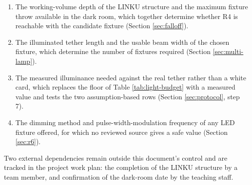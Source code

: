 \begin{enumerate}
    \item The working-volume depth of the LINKU structure and the maximum fixture throw available in the dark room, which together determine whether R4 is reachable with the candidate fixture (Section \ref{sec:falloff}).
    \item The illuminated tether length and the usable beam width of the chosen fixture, which determine the number of fixtures required (Section \ref{sec:multi-lamp}).
    \item The measured illuminance needed against the real tether rather than a white card, which replaces the floor of Table \ref{tab:light-budget} with a measured value and tests the two assumption-based rows (Section \ref{sec:protocol}, step 7).
    \item The dimming method and pulse-width-modulation frequency of any LED fixture offered, for which no reviewed source gives a safe value (Section \ref{sec:r6}).
\end{enumerate}

Two external dependencies remain outside this document's control and are tracked in the project work plan: the completion of the LINKU structure by a team member, and confirmation of the dark-room date by the teaching staff.
